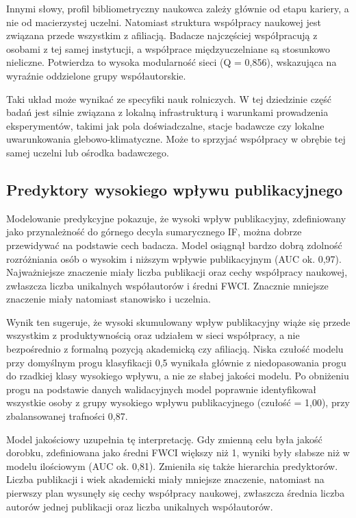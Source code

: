 \documentclass[
  polish,
  12pt,
  a4paper,
]{article}
\begin{document}
Innymi słowy, profil bibliometryczny naukowca zależy głównie od etapu
kariery, a nie od macierzystej uczelni. Natomiast struktura współpracy
naukowej jest związana przede wszystkim z afiliacją. Badacze najczęściej
współpracują z osobami z tej samej instytucji, a współprace
międzyuczelniane są stosunkowo nieliczne. Potwierdza to wysoka
modularność sieci (Q = 0,856), wskazująca na wyraźnie oddzielone grupy
współautorskie.

Taki układ może wynikać ze specyfiki nauk rolniczych. W tej dziedzinie
część badań jest silnie związana z lokalną infrastrukturą i warunkami
prowadzenia eksperymentów, takimi jak pola doświadczalne, stacje
badawcze czy lokalne uwarunkowania glebowo-klimatyczne. Może to sprzyjać
współpracy w obrębie tej samej uczelni lub ośrodka badawczego.

\subsection{Predyktory wysokiego wpływu
publikacyjnego}\label{predyktory-wysokiego-wpux142ywu-publikacyjnego}

Modelowanie predykcyjne pokazuje, że wysoki wpływ publikacyjny,
zdefiniowany jako przynależność do górnego decyla sumarycznego IF, można
dobrze przewidywać na podstawie cech badacza. Model osiągnął bardzo
dobrą zdolność rozróżniania osób o wysokim i niższym wpływie
publikacyjnym (AUC ok. 0,97). Najważniejsze znaczenie miały liczba
publikacji oraz cechy współpracy naukowej, zwłaszcza liczba unikalnych
współautorów i średni FWCI. Znacznie mniejsze znaczenie miały natomiast
stanowisko i uczelnia.

Wynik ten sugeruje, że wysoki skumulowany wpływ publikacyjny wiąże się
przede wszystkim z produktywnością oraz udziałem w sieci współpracy, a
nie bezpośrednio z formalną pozycją akademicką czy afiliacją. Niska
czułość modelu przy domyślnym progu klasyfikacji 0,5 wynikała głównie z
niedopasowania progu do rzadkiej klasy wysokiego wpływu, a nie ze słabej
jakości modelu. Po obniżeniu progu na podstawie danych walidacyjnych
model poprawnie identyfikował wszystkie osoby z grupy wysokiego wpływu
publikacyjnego (czułość = 1,00), przy zbalansowanej trafności 0,87.

Model jakościowy uzupełnia tę interpretację. Gdy zmienną celu była
jakość dorobku, zdefiniowana jako średni FWCI większy niż 1, wyniki były
słabsze niż w modelu ilościowym (AUC ok. 0,81). Zmieniła się także
hierarchia predyktorów. Liczba publikacji i wiek akademicki miały
mniejsze znaczenie, natomiast na pierwszy plan wysunęły się cechy
współpracy naukowej, zwłaszcza średnia liczba autorów jednej publikacji
oraz liczba unikalnych współautorów.
\end{document}

